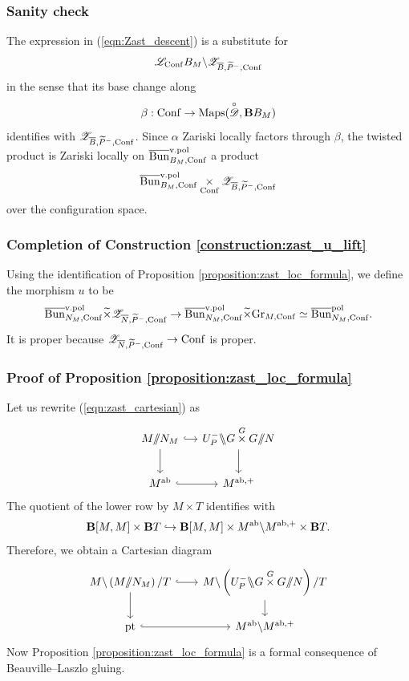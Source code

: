 \subsubsection{Sanity check} The expression in (\ref{eqn:Zast_descent}) is a substitute for
    \[\mathscr{L}_{\mathrm{Conf}} B_M \backslash \mathscr{Z}_{\overline{B}, \widetilde{P}^-, \mathrm{Conf}}\]
in the sense that its base change along
    \[\beta : \mathrm{Conf} \to \mathrm{Maps}(\overset{\circ}{\mathscr{D}}, \mathbf{B} B_M)\]
identifies with $\mathscr{Z}_{\overline{B}, \widetilde{P}^-, \mathrm{Conf}}$. Since $\alpha$ Zariski locally factors through $\beta$, the twisted product is Zariski locally on $\overline{\mathrm{Bun}}_{B_M,\mathrm{Conf}}^{\mathrm{v.}\mathrm{pol}}$ a product
    \[\overline{\mathrm{Bun}}_{B_M,\mathrm{Conf}}^{\mathrm{v.}\mathrm{pol}} \underset{\mathrm{Conf}}{\times} \mathscr{Z}_{\overline{B}, \widetilde{P}^-, \mathrm{Conf}}\]
over the configuration space.

\subsubsection{Completion of Construction \ref{construction:zast_u_lift}} Using the identification of Proposition \ref{proposition:zast_loc_formula}, we define the morphism $u$ to be
    \[
    \overline{\mathrm{Bun}}_{N_M, \mathrm{Conf}}^{{\mathrm{v.}\mathrm{pol}}} \widetilde{\times} \mathscr{Z}_{\overline{N}, \widetilde{P}^-, \mathrm{Conf}}
    \to \overline{\mathrm{Bun}}_{N_M, \mathrm{Conf}}^{{\mathrm{v.}\mathrm{pol}}} \widetilde{\times} \mathrm{Gr}_{M,\mathrm{Conf}}
    \simeq \overline{\mathrm{Bun}}_{N_M, \mathrm{Conf}}^{\mathrm{pol}}.
    \]
It is proper because $\mathscr{Z}_{\overline{N}, \widetilde{P}^-, \mathrm{Conf}} \to \mathrm{Conf}$ is proper.

\subsubsection{Proof of Proposition \ref{proposition:zast_loc_formula}} Let us rewrite (\ref{eqn:zast_cartesian}) as
\[
  \begin{tikzcd}[
  column sep={7em,between origins},
  row sep={4em,between origins}
]
    M \git N_M \arrow[r, hook] \arrow[d] & U_P^- \bss G \overset{G}{\times} G \git N \arrow[d] \\
    M^\ab \arrow[r, hook] & M^{\ab,+}
  \end{tikzcd}
\]
The quotient of the lower row by $M \times T$ identifies with
    \[\mathbf{B} [M,M] \times \mathbf{B} T \hookrightarrow \mathbf{B} [M,M] \times M^{\mathrm{ab}} \backslash M^{\mathrm{ab},+} \times \mathbf{B} T.\]
Therefore, we obtain a Cartesian diagram
\[
  \begin{tikzcd}[
  column sep={12em,between origins},
  row sep={4em,between origins}
]
    M \bs \left( M \git N_M \right) / T \arrow[r, hook] \arrow[d] & M \bs \left( U_P^- \bss G \overset{G}{\times} G \git N \right) / T \arrow[d] \\
    \pt \arrow[r, hook] & M^\ab \bs M^{\ab,+}
  \end{tikzcd}
\]
Now Proposition \ref{proposition:zast_loc_formula} is a formal consequence of Beauville--Laszlo gluing.

